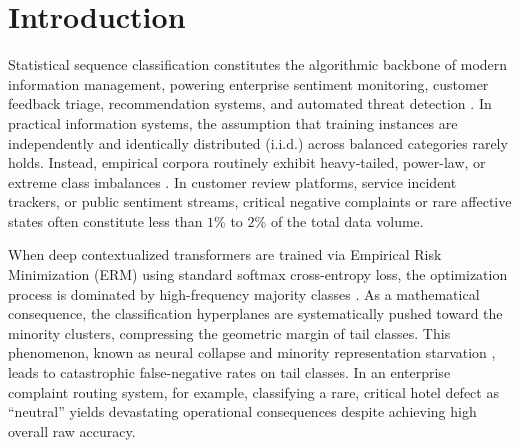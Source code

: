 \documentclass[final,5p,times,twocolumn]{elsarticle}
\begin{document}
\section{Introduction}
\label{sec:introduction}

Statistical sequence classification constitutes the algorithmic backbone of modern information management, powering enterprise sentiment monitoring, customer feedback triage, recommendation systems, and automated threat detection \cite{vaswani2017attention, devlin2019bert, cahyawijaya2021indonlg, koto2021discourse}. In practical information systems, the assumption that training instances are independently and identically distributed ($\text{i.i.d.}$) across balanced categories rarely holds. Instead, empirical corpora routinely exhibit heavy-tailed, power-law, or extreme class imbalances \cite{he2009learning, menon2021longtail, kini2021vector}. In customer review platforms, service incident trackers, or public sentiment streams, critical negative complaints or rare affective states often constitute less than $1\%$ to $2\%$ of the total data volume.

When deep contextualized transformers are trained via Empirical Risk Minimization (ERM) using standard softmax cross-entropy loss, the optimization process is dominated by high-frequency majority classes \cite{zhang2023deep}. As a mathematical consequence, the classification hyperplanes are systematically pushed toward the minority clusters, compressing the geometric margin of tail classes. This phenomenon, known as neural collapse and minority representation starvation \cite{fang2021exploring, thrampoulidis2022imbalance}, leads to catastrophic false-negative rates on tail classes. In an enterprise complaint routing system, for example, classifying a rare, critical hotel defect as ``neutral'' yields devastating operational consequences despite achieving high overall raw accuracy.
\end{document}
